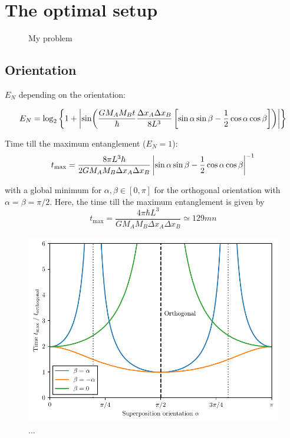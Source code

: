 \chapter{The optimal setup}\label{cha:the-optimal-setup}


\begin{figure}[!htbp]
  \centering
  \def\svgwidth{0.9\textwidth}
  
  \caption{My problem}
\end{figure}


\section{Orientation}
$E_N$ depending on the orientation:

\begin{equation}
  E_N = \log_2\left\{
    1 + \left\lvert
      \sin(
      \frac{G M_A M_B t}{\hbar} \frac{\Delta x_A \Delta x_B}{8L^3}
      \left[ \sin\alpha\sin\beta - \frac{1}{2}\cos\alpha\cos\beta \right]
      )
      \right\rvert
  \right\}
\end{equation}

Time till the maximum entanglement ($E_N = 1$):
\begin{equation}
  t_\mathrm{max} = \frac{8 \pi L^3 \hbar}{2 G M_A M_B \Delta x_A\Delta x_B} \left\lvert\sin\alpha\sin\beta - \frac{1}{2}\cos\alpha\cos\beta\right\rvert^{-1}
\end{equation}

with a global minimum for $\alpha,\beta \in [0, \pi]$ for the orthogonal orientation with $\alpha = \beta = \pi/2$. Here, the time till the maximum entanglement is given by
\begin{equation}
  t_\mathrm{max} = \frac{4 \pi \hbar L^3}{G M_A M_B \Delta x_A \Delta x_B} \simeq 129\si{mn}
\end{equation}

\begin{figure}[!htbp]
  \centering
  \includegraphics[width=\textwidth]{./../figures/EN-orientation.pdf}
  \caption{...}
  \label{fig:5:optimal-orientation}
\end{figure}



